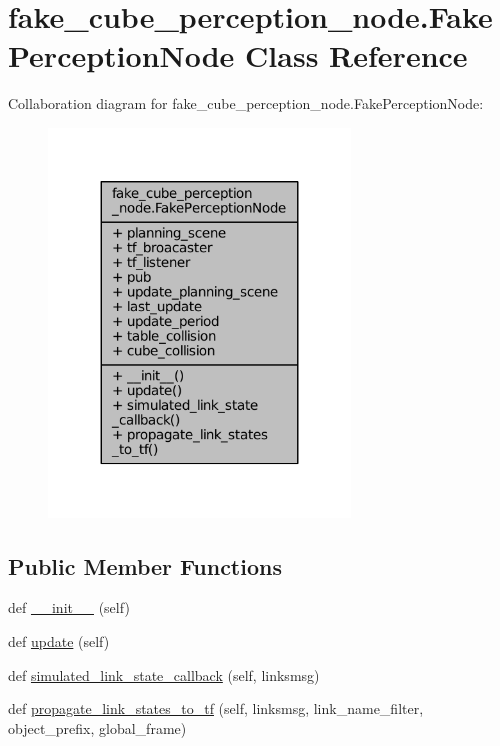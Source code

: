 \hypertarget{classfake__cube__perception__node_1_1FakePerceptionNode}{}\section{fake\+\_\+cube\+\_\+perception\+\_\+node.\+Fake\+Perception\+Node Class Reference}
\label{classfake__cube__perception__node_1_1FakePerceptionNode}


Collaboration diagram for fake\+\_\+cube\+\_\+perception\+\_\+node.\+Fake\+Perception\+Node\+:
\nopagebreak
\begin{figure}[H]
\begin{center}
\leavevmode
\includegraphics[width=227pt]{classfake__cube__perception__node_1_1FakePerceptionNode__coll__graph}
\end{center}
\end{figure}
\subsection*{Public Member Functions}
\begin{DoxyCompactItemize}
\item 
def \hyperlink{classfake__cube__perception__node_1_1FakePerceptionNode_a6f5d90816c2222cf76bd632b5ad46457}{\+\_\+\+\_\+init\+\_\+\+\_\+} (self)
\item 
def \hyperlink{classfake__cube__perception__node_1_1FakePerceptionNode_ae73741e7f84f057cbf109698e70a2515}{update} (self)
\item 
def \hyperlink{classfake__cube__perception__node_1_1FakePerceptionNode_ac1127eae8d2eda994b22873529bd198f}{simulated\+\_\+link\+\_\+state\+\_\+callback} (self, linksmsg)
\item 
def \hyperlink{classfake__cube__perception__node_1_1FakePerceptionNode_aeac788f768e625ecbe445c6af105d3f8}{propagate\+\_\+link\+\_\+states\+\_\+to\+\_\+tf} (self, linksmsg, link\+\_\+name\+\_\+filter, object\+\_\+prefix, global\+\_\+frame)
\end{DoxyCompactItemize}
